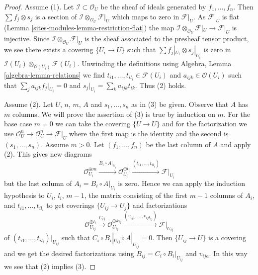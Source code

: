 \begin{proof}
Assume (1). Let $\mathcal{I} \subset \mathcal{O}_U$ be the sheaf of ideals
generated by $f_1, \ldots, f_n$. Then $\sum f_j \otimes s_j$ is
a section of $\mathcal{I} \otimes_{\mathcal{O}_U} \mathcal{F}|_U$
which maps to zero in $\mathcal{F}|_U$. As $\mathcal{F}|_U$ is flat
(Lemma \ref{sites-modules-lemma-restriction-flat}) the map
$\mathcal{I} \otimes_{\mathcal{O}_U} \mathcal{F}|_U \to \mathcal{F}|_U$
is injective. Since $\mathcal{I} \otimes_{\mathcal{O}_U} \mathcal{F}|_U$
is the sheaf associated to the presheaf tensor product, we see
there exists a covering $\{U_i \to U\}$ such
that $\sum f_j|_{U_i} \otimes s_j|_{U_i}$ is zero in
$\mathcal{I}(U_i) \otimes_{\mathcal{O}(U_i)} \mathcal{F}(U_i)$.
Unwinding the definitions using Algebra, Lemma \ref{algebra-lemma-relations}
we find $t_{i1}, \ldots, t_{i l_i} \in \mathcal{F}(U_i)$ and
$a_{ijk} \in \mathcal{O}(U_i)$
such that $\sum_j a_{ijk}f_j|_{U_i} = 0$ and
$s_j|_{U_i} = \sum_k a_{ijk}t_{ik}$.
Thus (2) holds.

\medskip\noindent
Assume (2). Let $U$, $n$, $m$, $A$ and $s_1, \ldots, s_n$ as in (3) be given.
Observe that $A$ has $m$ columns. We will prove the assertion of (3)
is true by induction on $m$. For the base case $m = 0$ we
can take the covering $\{U \to U\}$ and for the factorization we use
$\mathcal{O}_U^n \to \mathcal{O}_U^n \to \mathcal{F}|_U$ where
the first map is the identity and the second is $(s_1, \ldots, s_n)$.
Assume $m > 0$. Let $(f_1, \ldots, f_n)$ be the last column of $A$
and apply (2). This gives new diagrams
$$
\mathcal{O}_{U_i}^{\oplus m} \xrightarrow{B_i \circ A|_{U_i}}
\mathcal{O}_{U_i}^{\oplus l_i} \xrightarrow{(t_{i1}, \ldots, t_{il_i})}
\mathcal{F}|_{U_i}
$$
but the last column of $A_i = B_i \circ A|_{U_i}$ is zero.
Hence we can apply the induction hypothesis to
$U_i$, $l_i$, $m - 1$, the matrix consisting of
the first $m - 1$ columns of $A_i$, and $t_{i1}, \ldots, t_{il_i}$
to get coverings $\{U_{ij} \to U_j\}$ and factorizations
$$
\mathcal{O}_{U_{ij}}^{\oplus l_i}
\xrightarrow{C_{ij}}
\mathcal{O}_{U_{ij}}^{\oplus k_{ij}}
\xrightarrow{(v_{ij1}, \ldots, v_{ij k_{ij}})}
\mathcal{F}|_{U_{ij}}
$$
of $(t_{i1}, \ldots, t_{il_i})|_{U_{ij}}$ such that
$C_i \circ B_i|_{U_{ij}} \circ A|_{U_{ij}} = 0$.
Then $\{U_{ij} \to U\}$ is a covering and we get the
desired factorizations
using $B_{ij} = C_i \circ B_i|_{U_{ij}}$ and
$v_{ija}$. In this way we see that (2) implies (3).


\end{proof}
